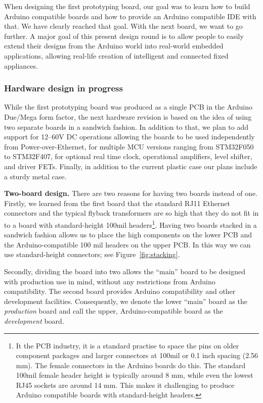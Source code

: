 \documentclass[draft,a4paper]{siamltex}
\begin{document}
When designing the first prototyping board, our goal was to learn how
to build Arduino compatible boards and how to provide an Arduino
compatible IDE with that.  We have clearly reached that goal.  With
the next board, we want to go further.  A major goal of this present
design round is to allow people to easily extend their designs from
the Arduino world into real-world embedded applications, allowing
real-life creation of intelligent and connected fixed appliances.

\subsubsection{Hardware design in progress}

While the first prototyping board was produced as a single PCB in the
Arduino Due/Mega form factor, the next hardware revision is based on
the idea of using two separate boards in a sandwich fashion.  In
addition to that, we plan to add support for 12--60V DC operations allowing
the boards to be used independently from Power-over-Ethernet, for
multiple MCU versions ranging from STM32F050 to STM32F407, for
optional real time clock, operational amplifiers, level shifter, and
driver FETs.  Finally, in addition to the current plastic case our
plans include a sturdy metal case.

{\bf Two-board design.}
There are two reasons for having two boards instead of one.  Firstly,
we learned from the first board that the standard RJ11 Ethernet
connectors and the typical flyback transformers are so high that they
do not fit in to a board with standard-height 100mil
headers\footnote{It the PCB industry, it is a standard practise to
  space the pins on older component packages and larger connectors at
  100mil or 0.1 inch spacing (2.56 mm).  The female connectors in the Arduino
  boards do this.  The standard 100mil female header height is
  typically around 8 mm, while even the lowest RJ45 sockets
  are around 14 mm.  This makes it challenging to produce Arduino
  compatible boards with standard-height headers.}.
Having two boards stacked in a sandwich fashion allows us to place the
high components on the lower PCB and the Arduino-compatible 100 mil
headers on the upper PCB.  In this way we can use standard-height
connectors; see Figure~\ref{fig:stacking}.

Secondly, dividing the board into two allows the ``main'' board to be
designed with production use in mind, without any restrictions from
Arduino compatibility.  The second board provides Arduino
compatibility and other development facilities.  Consequently, we denote
the lower ``main'' board as the {\it production} board and call the
upper, Arduino-compatible board as the {\it development} board.
\end{document}
